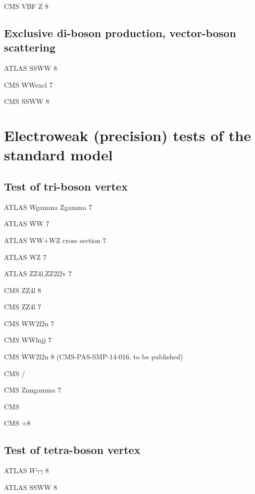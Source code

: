\documentclass[12pt]{iopart}
\begin{document}
CMS VBF Z 8 \TeV~\cite{Khachatryan:2014dea}

\subsection{Exclusive di-boson production, vector-boson scattering}

ATLAS SSWW 8 \TeV~\cite{Aad:2014zda}

CMS WWexcl 7 \TeV~\cite{Chatrchyan:2013foa}

CMS SSWW 8 \TeV~\cite{Khachatryan:2014sta}

\section{Electroweak (precision) tests of the standard model}
\subsection{Test of tri-boson vertex}

ATLAS Wgamma Zgamma 7 \TeV~\cite{Aad:2013izg}

ATLAS WW 7 \TeV~\cite{ATLAS:2012mec}

ATLAS WW+WZ cross section 7 \TeV~\cite{Aad:2014mda}

ATLAS WZ 7 \TeV~\cite{Aad:2012twa}

ATLAS ZZ4l,ZZ2l2v 7 \TeV~\cite{Aad:2012awa}

CMS ZZ4l 8 \TeV~\cite{Khachatryan:2014dia}

CMS ZZ4l 7 \TeV~\cite{Chatrchyan:2012sga}

CMS WW2l2n 7 \TeV~\cite{Chatrchyan:2013yaa}

CMS WWlnjj 7 \TeV~\cite{Chatrchyan:2012bd}

CMS WW2l2n 8 \TeV (CMS-PAS-SMP-14-016, to be published)

CMS \Wg/ \TeV~\cite{Chatrchyan:2013fya}

CMS Znngamma 7 \TeV~\cite{Chatrchyan:2013nda}

CMS  \TeV~\cite{Khachatryan:2015kea}

CMS +8 \TeV~\cite{Khachatryan:2015pba}

\subsection{Test of tetra-boson vertex}

ATLAS $W\gamma\gamma$ 8 \TeV~\cite{Aad:2015uqa}

ATLAS SSWW 8 \TeV~\cite{Aad:2014zda}
\end{document}
